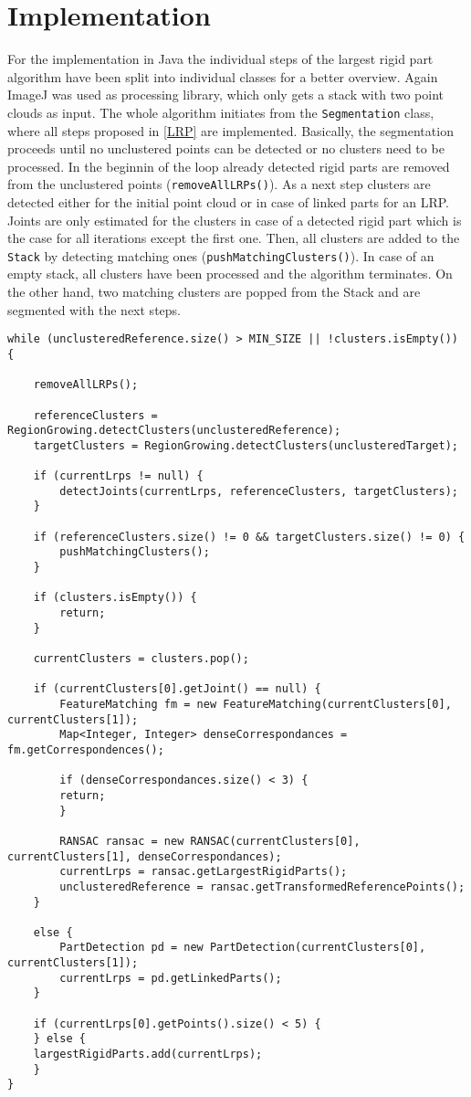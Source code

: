 \section{Implementation}
\label{ImplementationLRP}
For the implementation in Java the individual steps of the largest rigid part algorithm have been split into individual classes for a better overview. Again ImageJ was used as processing library, which only gets a stack with two point clouds as input.
%
%
The whole algorithm initiates from the \texttt{Segmentation} class, where all steps proposed in \ref{LRP} are implemented. Basically, the segmentation proceeds until no unclustered points can be detected or no clusters need to be processed. In the beginnin of the loop already detected rigid parts are removed from the unclustered points (\texttt{removeAllLRPs()}). As a next step clusters are detected either for the initial point cloud or in case of linked parts for an LRP. Joints are only estimated for the clusters in case of a detected rigid part which is the case for all iterations except the first one. Then, all clusters are added to the \texttt{Stack} by detecting matching ones (\texttt{pushMatchingClusters()}). In case of an empty stack, all clusters have been processed and the algorithm terminates. On the other hand, two matching clusters are popped from the Stack and are segmented with the next steps.

\begin{lstlisting}
while (unclusteredReference.size() > MIN_SIZE || !clusters.isEmpty()) {

	removeAllLRPs();

	referenceClusters = RegionGrowing.detectClusters(unclusteredReference);
	targetClusters = RegionGrowing.detectClusters(unclusteredTarget);

	if (currentLrps != null) {
		detectJoints(currentLrps, referenceClusters, targetClusters);
	}

	if (referenceClusters.size() != 0 && targetClusters.size() != 0) {
		pushMatchingClusters();
	}

	if (clusters.isEmpty()) {
		return;
	}

	currentClusters = clusters.pop();

	if (currentClusters[0].getJoint() == null) {
		FeatureMatching fm = new FeatureMatching(currentClusters[0], currentClusters[1]);
		Map<Integer, Integer> denseCorrespondances = fm.getCorrespondences();

		if (denseCorrespondances.size() < 3) {
		return;
		}

		RANSAC ransac = new RANSAC(currentClusters[0], currentClusters[1], denseCorrespondances);
		currentLrps = ransac.getLargestRigidParts();
		unclusteredReference = ransac.getTransformedReferencePoints();
	}

	else {
		PartDetection pd = new PartDetection(currentClusters[0], currentClusters[1]);
		currentLrps = pd.getLinkedParts();
	}

	if (currentLrps[0].getPoints().size() < 5) {
	} else {
	largestRigidParts.add(currentLrps);
	}
}
\end{lstlisting}


